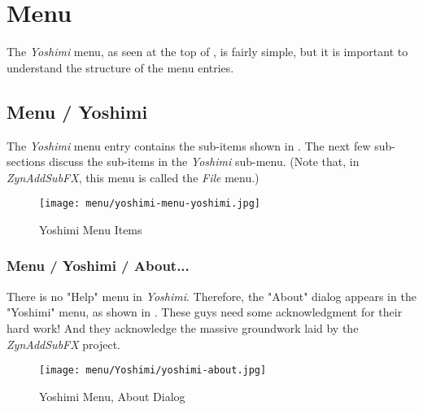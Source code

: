 %
%
%

\section{Menu}
\label{sec:menu}

   The \textsl{Yoshimi} menu, as seen at the top of
   ,
   is fairly simple, but it is important to understand the
   structure of the menu entries.

\subsection{Menu / Yoshimi}
\label{subsec:menu_yoshimi}

   The \textsl{Yoshimi}
   menu entry contains the sub-items shown in
   .
   The next few sub-sections discuss the sub-items in the 
   \textsl{Yoshimi} sub-menu.
   (Note that, in \textsl{ZynAddSubFX}, this menu is called the
   \textsl{File} menu.)

\begin{figure}[H]
   \centering 
   \texttt{[image: menu/yoshimi-menu-yoshimi.jpg]}
   \caption{Yoshimi Menu Items}
   \label{fig:yoshimi_menu_items}
\end{figure}

\subsubsection{Menu / Yoshimi / About...}
\label{subsubsec:menu_yoshimi_about}

   There is no "Help" menu in \textsl{Yoshimi}.
   Therefore, the "About" dialog appears in the "Yoshimi" menu, as shown in
   .
   These guys need some acknowledgment for their hard work!
   And they acknowledge the massive groundwork laid by the
   \textsl{ZynAddSubFX} project.

\begin{figure}[H]
   \centering 
   \texttt{[image: menu/Yoshimi/yoshimi-about.jpg]}
   \caption{Yoshimi Menu, About Dialog}
   \label{fig:yoshimi_about_dialog}
\end{figure}

